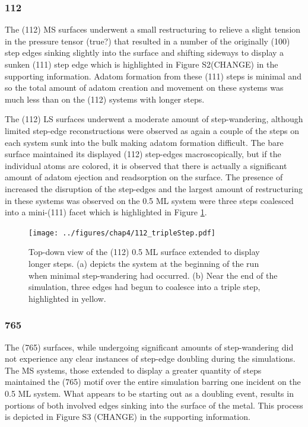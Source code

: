 \subsubsection{112}
The (112) MS surfaces underwent a small restructuring to relieve a slight
tension in the pressure tensor (true?) that resulted in a number of the
originally (100) step edges sinking slightly into the surface and shifting
sideways to display a sunken (111) step edge which is highlighted in Figure
S2(CHANGE) in  the supporting information.  Adatom formation from these (111)
steps is minimal and so the total amount of adatom creation and movement on
these systems was much less than on the (112) systems with longer steps. 

The (112) LS surfaces underwent a moderate amount of step-wandering, although
limited step-edge reconstructions were observed as again a couple of the steps
on each system sunk into the bulk making adatom formation difficult.  The bare
surface maintained its displayed (112) step-edges macroscopically, but if the
individual atoms are colored, it is observed that there is actually a
significant amount of adatom ejection and readsorption on the surface. The
presence of  increased the disruption of the step-edges and the largest
amount of restructuring in these systems was observed on the 0.5 ML system were
three steps coalesced into a mini-(111) facet which is highlighted in Figure
\ref{fig:tripleStep}.

\begin{figure}
  \texttt{[image: ../figures/chap4/112\_tripleStep.pdf]}
  \caption{Top-down view of the (112) 0.5 ML surface extended to display longer
steps. (a) depicts the system at the beginning of the run when minimal
step-wandering had occurred. (b) Near the end of the simulation, three edges
had begun to coalesce into a triple step, highlighted in yellow.}
  \label{fig:tripleStep}
\end{figure}

\subsubsection{765}
The (765) surfaces, while undergoing significant amounts of step-wandering did
not experience any clear instances of step-edge doubling during the
simulations. The MS systems, those extended to display a greater quantity of
steps maintained the (765) motif over the entire simulation barring one
incident on the 0.5 ML system. What appears to be starting out as a doubling
event, results in portions of both involved edges sinking into the surface of
the metal. This process is depicted in Figure S3 (CHANGE) in the supporting
information.

